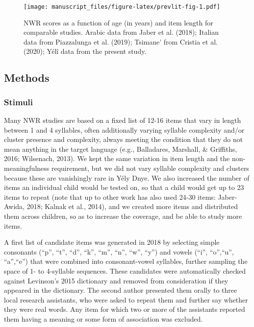 \documentclass[english,,man,floatsintext]{apa6}
\begin{document}
\begin{figure}
\centering
\texttt{[image: manuscript\_files/figure-latex/prevlit-fig-1.pdf]}
\caption{\label{fig:prevlit-fig}NWR scores as a function of age (in years) and item length for comparable studies. Arabic data from Jaber et al. (2018); Italian data from Piazzalunga et al. (2019); Tsimane' from Cristia et al. (2020); Yélî data from the present study.}
\end{figure}

\hypertarget{methods}{%
\subsection{Methods}\label{methods}}

\hypertarget{stimuli}{%
\subsubsection{Stimuli}\label{stimuli}}

Many NWR studies are based on a fixed list of 12-16 items that vary in length between 1 and 4 syllables, often additionally varying syllable complexity and/or cluster presence and complexity, always meeting the condition that they do not mean anything in the target language (e.g., Balladares, Marshall, \& Griffiths, 2016; Wilsenach, 2013). We kept the same variation in item length and the non-meaningfulness requirement, but we did not vary syllable complexity and clusters because these are vanishingly rare in Yély Dnye. We also increased the number of items an individual child would be tested on, so that a child would get up to 23 items to repeat (note that up to other work has also used 24-30 items: Jaber-Awida, 2018; Kalnak et al., 2014), and we created more items and distributed them across children, so as to increase the coverage, and be able to study more items.

A first list of candidate items was generated in 2018 by selecting simple consonants (``p'', ``t'', ``d'', ``k'', ``m'', ``n'', ``w'', ``y'') and vowels (``i'', ``o'',``u'', ``a'',``e'') that were combined into consonant-vowel syllables, further sampling the space of 1- to 4-syllable sequences. These candidates were automatically checked against Levinson's 2015 dictionary and removed from consideration if they appeared in the dictionary. The second author presented them orally to three local research assistants, who were asked to repeat them and further say whether they were real words. Any item for which two or more of the assistants reported them having a meaning or some form of association was excluded.
\end{document}
